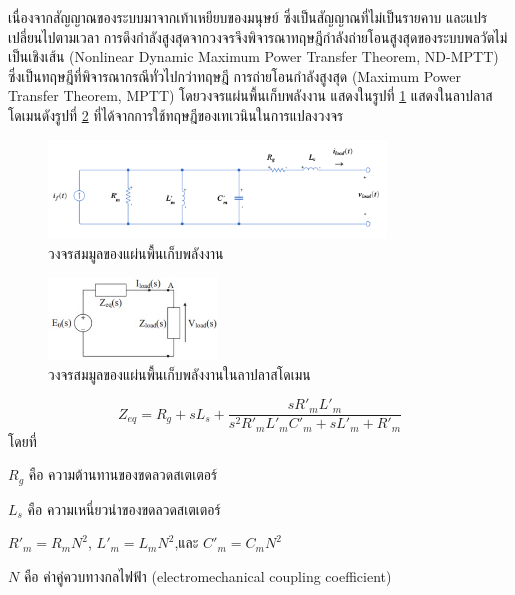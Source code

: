 \documentclass[11pt,a4paper]{article}
\begin{document}
เนื่องจากสัญญาณของระบบมาจากเท้าเหยียบของมนุษย์ ซึ่งเป็นสัญญาณที่ไม่เป็นรายคาบ และแปรเปลี่ยนไปตามเวลา การดึงกำลังสูงสุดจากวงจรจึงพิจารณาทฤษฎีกำลังถ่ายโอนสูงสุดของระบบพลวัตไม่เป็นเชิงเส้น (Nonlinear Dynamic Maximum Power Transfer Theorem, ND-MPTT) \cite{ndmppt} ซึ่งเป็นทฤษฎีที่พิจารณากรณีทั่วไปกว่าทฤษฎี การถ่ายโอนกำลังสูงสุด (Maximum Power Transfer Theorem, MPTT)
โดยวงจรแผ่นพื้นเก็บพลังงาน แสดงในรูปที่ \ref{harvest_circuit} แสดงในลาปลาสโดเมนดังรูปที่ \ref{laplce_genpath_circuit} ที่ได้จากการใช้ทฤษฎีของเทเวนินในการแปลงวงจร
\begin{figure}[H]
    \begin{center}
        \includegraphics[width=0.8\textwidth]{harvest_circuit.png}
    \end{center}
    \caption{วงจรสมมูลของแผ่นพื้นเก็บพลังงาน}
    \label{harvest_circuit}
\end{figure}
\begin{figure}[H]
    \begin{center}
        \includegraphics[width=0.4\textwidth]{laplce_genpath_circuit.jpg}
    \end{center}
    \caption{วงจรสมมูลของแผ่นพื้นเก็บพลังงานในลาปลาสโดเมน \cite{ndmppt}}
    \label{laplce_genpath_circuit}
\end{figure}
\begin{equation}\label{zeq}
    Z_{eq}  = R_{g} + sL_{s} + \frac{ sR'_{m}L'_{m} }{ s^2R'_{m}L'_{m}C'_{m} + sL'_{m} + R'_{m} }
\end{equation}
โดยที่

$R_{g}$ คือ ความต้านทานของขดลวดสเตเตอร์

$L_{s}$ คือ ความเหนี่ยวนำของขดลวดสเตเตอร์

$R'_{m} = R_{m}N^2$, $L'_{m} = L_{m}N^2$,และ $C'_{m} = C_{m}N^2$

$N$ คือ ค่าคู่ควบทางกลไฟฟ้า (electromechanical coupling coefficient)
\end{document}
